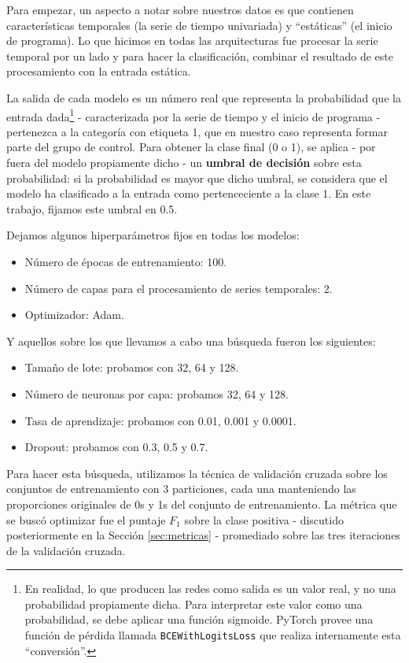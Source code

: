 \documentclass[../../main.tex]{subfiles}
\begin{document}
Para empezar, un aspecto a notar sobre nuestros datos es que contienen características
temporales (la serie de tiempo univariada) y ``estáticas'' (el inicio de programa). Lo que
hicimos en todas las arquitecturas fue procesar la serie temporal por un lado y para hacer
la clasificación, combinar el resultado de este procesamiento con la entrada estática.

La salida de cada modelo es un número real que representa la probabilidad que la entrada
dada\footnote{En realidad, lo que producen las redes como salida es un valor real, y no
una probabilidad propiamente dicha. Para interpretar este valor como una probabilidad, se
debe aplicar una función sigmoide. PyTorch provee una función de pérdida llamada
\texttt{BCEWithLogitsLoss}\cite{bcewithlogitsloss} que realiza internamente esta
``conversión''.} - caracterizada por la serie de tiempo y el inicio de programa -
pertenezca a la categoría con etiqueta 1, que en nuestro caso representa formar parte del
grupo de control. Para obtener la clase final (0 o 1), se aplica - por fuera del modelo
propiamente dicho - un \textbf{umbral de decisión} sobre esta probabilidad: si la
probabilidad es mayor que dicho umbral, se considera que el modelo ha clasificado a la
entrada como pertenceciente a la clase 1. En este trabajo, fijamos este umbral en 0.5.


Dejamos algunos hiperparámetros fijos en todas los modelos:
\begin{itemize}[itemsep=0cm, topsep=0cm, parsep=0cm, partopsep=0cm]
    \item Número de épocas de entrenamiento: 100.
    \item Número de capas para el procesamiento de series temporales: 2.
    \item Optimizador: Adam.
\end{itemize}

Y aquellos sobre los que llevamos a cabo una búsqueda fueron los siguientes:
\begin{itemize}[itemsep=0cm, topsep=0cm, parsep=0cm, partopsep=0cm]
    \item Tamaño de lote: probamos con 32, 64 y 128.
    \item Número de neuronas por capa: probamos 32, 64 y 128.
    \item Tasa de aprendizaje: probamos con 0.01, 0.001 y 0.0001.
    \item Dropout: probamos con 0.3, 0.5 y 0.7.
\end{itemize}

Para hacer esta búsqueda, utilizamos la técnica de validación cruzada sobre los conjuntos
de entrenamiento con 3 particiones, cada una manteniendo las proporciones originales de 0s
y 1s del conjunto de entrenamiento. La métrica que se buscó optimizar fue el puntaje
\(F_1\) sobre la clase positiva - discutido posteriormente en la Sección
\ref{sec:metricas} - promediado sobre las tres iteraciones de la validación cruzada.
\end{document}
